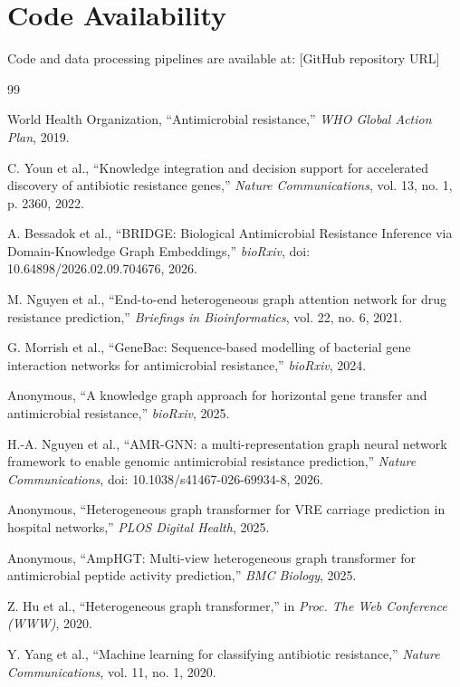 \documentclass[conference]{IEEEtran}
\begin{document}
\section*{Code Availability}

Code and data processing pipelines are available at: [GitHub repository URL]

\begin{thebibliography}{99}

World Health Organization, ``Antimicrobial resistance,'' \textit{WHO Global Action Plan}, 2019.

C. Youn et al., ``Knowledge integration and decision support for accelerated discovery of antibiotic resistance genes,'' \textit{Nature Communications}, vol. 13, no. 1, p. 2360, 2022.

A. Bessadok et al., ``BRIDGE: Biological Antimicrobial Resistance Inference via Domain-Knowledge Graph Embeddings,'' \textit{bioRxiv}, doi: 10.64898/2026.02.09.704676, 2026.

M. Nguyen et al., ``End-to-end heterogeneous graph attention network for drug resistance prediction,'' \textit{Briefings in Bioinformatics}, vol. 22, no. 6, 2021.

G. Morrish et al., ``GeneBac: Sequence-based modelling of bacterial gene interaction networks for antimicrobial resistance,'' \textit{bioRxiv}, 2024.

Anonymous, ``A knowledge graph approach for horizontal gene transfer and antimicrobial resistance,'' \textit{bioRxiv}, 2025.

H.-A. Nguyen et al., ``AMR-GNN: a multi-representation graph neural network framework to enable genomic antimicrobial resistance prediction,'' \textit{Nature Communications}, doi: 10.1038/s41467-026-69934-8, 2026.

Anonymous, ``Heterogeneous graph transformer for VRE carriage prediction in hospital networks,'' \textit{PLOS Digital Health}, 2025.

Anonymous, ``AmpHGT: Multi-view heterogeneous graph transformer for antimicrobial peptide activity prediction,'' \textit{BMC Biology}, 2025.

Z. Hu et al., ``Heterogeneous graph transformer,'' in \textit{Proc. The Web Conference (WWW)}, 2020.

Y. Yang et al., ``Machine learning for classifying antibiotic resistance,'' \textit{Nature Communications}, vol. 11, no. 1, 2020.


\end{thebibliography}
\end{document}
